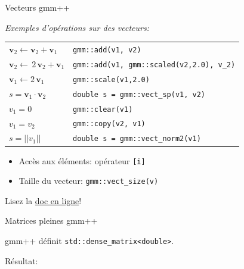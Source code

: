 \documentclass[
mode=present,    %
paper=a4paper,   %
orient=landscape,
display=slides,   %
size=10pt,     %
style=romain   %
]{powerdot}
\begin{document}
\begin{slide}[method=file, toc=]{Vecteurs gmm++}  %

\emph{Exemples d'opérations sur des vecteurs:}

\bigskip

\begin{tabular}{l|l}
  $\boldsymbol{v}_2\leftarrow\boldsymbol{v}_2+\boldsymbol{v}_1$      & \verb$gmm::add(v1, v2)$ \\
  $\boldsymbol{v}_2\leftarrow\, 2\,\boldsymbol{v}_2+\boldsymbol{v}_1$  & \verb$gmm::add(v1, gmm::scaled(v2,2.0), v_2)$\\
  $\boldsymbol{v}_1\leftarrow 2\,\boldsymbol{v}_1$         & \verb$gmm::scale(v1,2.0)$  \\
  $ s = \boldsymbol{v}_1\cdot \boldsymbol{v}_2$             & \verb$double s = gmm::vect_sp(v1, v2)$\\
  $ v_1 = 0$                                                & \verb$gmm::clear(v1)$ \\
  $ v_1 = v_2$                                              & \verb$gmm::copy(v2, v1)$ \\
  $ s = ||v_1||$                                            & \verb$double s = gmm::vect_norm2(v1)$ \\
\end{tabular}

\bigskip

\begin{itemize}
\item Accès aux éléments: opérateur \verb$[i]$
\item Taille du vecteur: \verb$gmm::vect_size(v)$
\end{itemize}


Lisez la \href{http://download.gna.org/getfem/html/homepage/userdoc/index.html}{doc en ligne}!

\end{slide}

\begin{slide}[method=file, toc=Matrices pleines]{Matrices pleines gmm++}  %

gmm++ définit \verb$std::dense_matrix<double>$.


Résultat:


\end{slide}
\end{document}
